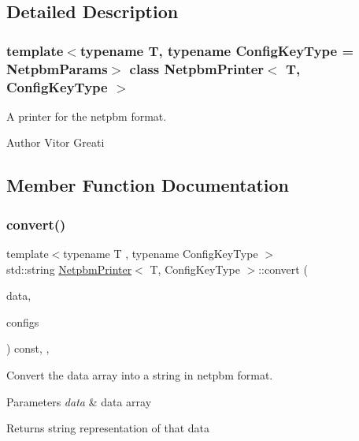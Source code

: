 \subsection{Detailed Description}
\subsubsection*{template$<$typename T, typename Config\+Key\+Type = Netpbm\+Params$>$\newline
class Netpbm\+Printer$<$ T, Config\+Key\+Type $>$}

A printer for the netpbm format. 

\begin{DoxyAuthor}{Author}
Vitor Greati 
\end{DoxyAuthor}


\subsection{Member Function Documentation}
\mbox{\label{class_netpbm_printer_a7a361fc4d114a12cb5c2311744dc3d3d}} 
\subsubsection{\texorpdfstring{convert()}{convert()}}
{\footnotesize\ttfamily template$<$typename T , typename Config\+Key\+Type $>$ \\
std\+::string \mbox{\hyperlink{class_netpbm_printer}{Netpbm\+Printer}}$<$ T, Config\+Key\+Type $>$\+::convert (\begin{DoxyParamCaption}\item[{const T $\ast$}]{data,  }\item[{const \mbox{\hyperlink{class_configs}{Configs}}$<$ Config\+Key\+Type $>$ \&}]{configs }\end{DoxyParamCaption}) const\hspace{0.3cm}{\ttfamily [override]}, {\ttfamily [protected]}, {\ttfamily [virtual]}}



Convert the data array into a string in netpbm format. 


\begin{DoxyParams}{Parameters}
{\em data} & data array \\
\hline
\end{DoxyParams}
\begin{DoxyReturn}{Returns}
string representation of that data 
\end{DoxyReturn}


